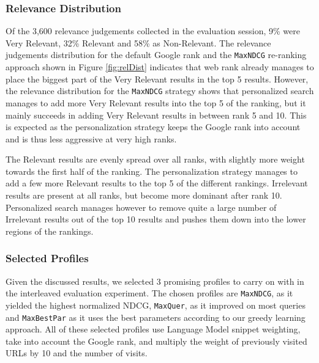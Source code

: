 \documentclass{sig-alternate}
\begin{document}
\subsubsection{Relevance Distribution}

\begin{figure*}
\centering
{}
\caption{Distribution of relevance at rank for the Google and {\tt MaxNDCG} rankings}
\label{fig:relDist}
\end{figure*}

Of the 3,600 relevance judgements collected in the evaluation session, 9\% were Very Relevant, 32\% Relevant and 58\% as Non-Relevant. The relevance judgements distribution for the default Google rank and the {\tt MaxNDCG} re-ranking approach shown in Figure \ref{fig:relDist} indicates that web rank already manages to place the biggest part of the Very Relevant results in the top 5 results. However, the relevance distribution for the {\tt MaxNDCG} strategy shows that personalized search manages to add more Very Relevant results into the top 5 of the ranking, but it mainly succeeds in adding Very Relevant results in between rank 5 and 10. This is expected as the personalization strategy keeps the Google rank into account and is thus less aggressive at very high ranks.

The Relevant results are evenly spread over all ranks, with slightly more weight towards the first half of the ranking. The personalization strategy manages to add a few more Relevant results to the top 5 of the different rankings. Irrelevant results are present at all ranks, but become more dominant after rank 10. Personalized search manages however to remove quite a large number of Irrelevant results out of the top 10 results and pushes them down into the lower regions of the rankings.

\subsubsection{Selected Profiles}

Given the discussed results, we selected 3 promising profiles to carry on with in the interleaved evaluation experiment. The chosen profiles are {\tt MaxNDCG}, as it yielded the highest normalized NDCG, {\tt MaxQuer}, as it improved on most queries and {\tt MaxBestPar} as it uses the best parameters according to our greedy learning approach. All of these selected profiles use Language Model snippet weighting, take into account the Google rank, and multiply the weight of previously visited URLs by 10 and the number of visits.
\end{document}
